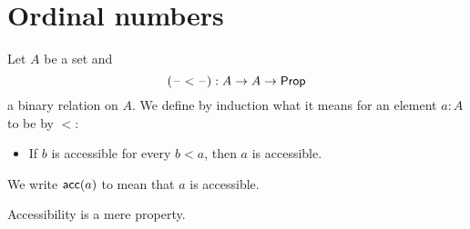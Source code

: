 \documentclass[hott-all.tex]{subfiles}
\begin{document}
\section{Ordinal numbers}
% 
% 
\begin{defn}
  Let $A$ be a set and
  \[(\mathord{\hspace{1pt}\text{--}\hspace{1pt}}<\mathord{\hspace{1pt}\text{--}\hspace{1pt}}):A\to A\to \mathsf{Prop}\]
  a binary relation on $A$.
  We define by induction what it means for an element $a:A$ to be 
  by $<$:
  \begin{itemize}
  \item If $b$ is accessible for every $b<a$, then $a$ is accessible.
  \end{itemize}
  We write $\mathsf{acc}(a)$ to mean that $a$ is accessible.
\end{defn}
% 
% 
% 
% 
\begin{lem}
  Accessibility is a mere property.
\end{lem}
\end{document}
